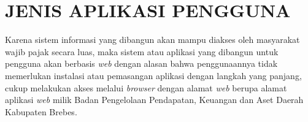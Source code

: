 \chapter{JENIS APLIKASI PENGGUNA}

Karena sistem informasi yang dibangun akan mampu diakses oleh masyarakat wajib pajak secara luas, maka sistem atau aplikasi yang dibangun untuk pengguna akan berbasis \textit{web} dengan alasan bahwa penggunaannya tidak memerlukan instalasi atau pemasangan aplikasi dengan langkah yang panjang, cukup melakukan akses melalui \textit{browser} dengan alamat \textit{web} berupa alamat aplikasi \textit{web} milik Badan Pengelolaan Pendapatan, Keuangan dan Aset Daerah Kabupaten Brebes.